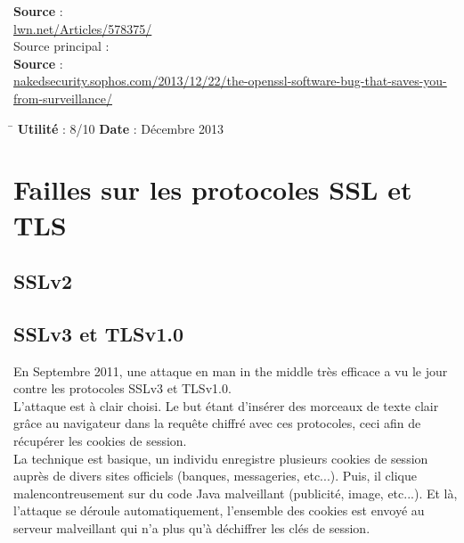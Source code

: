\documentclass{article}
\begin{document}
	\textbf{Source} : \\
	\href{https://lwn.net/Articles/578375/}{lwn.net/Articles/578375/}\\

	Source principal : \\
	\textbf{Source} : \\
	\href{http://nakedsecurity.sophos.com/2013/12/22/the-openssl-software-bug-that-saves-you-from-surveillance/}
	{nakedsecurity.sophos.com/2013/12/22/the-openssl-software-bug-that-saves-you-from-surveillance/}

	\begin{tabbing}
		\hspace{10cm}\=\kill
		\textbf{Utilité} : 8/10 \>	\textbf{Date} : Décembre 2013\\
	\end{tabbing}

	\newpage
	
	
	
	
\section{Failles sur les protocoles SSL et TLS}

\subsection{SSLv2}


\subsection{SSLv3 et TLSv1.0}

	En Septembre 2011, une attaque en man in the middle très efficace
	a vu le jour contre les protocoles SSLv3 et TLSv1.0.\\
	
	L'attaque est à clair choisi. Le but étant d'insérer des morceaux de
	texte clair grâce au navigateur dans la requête chiffré avec ces
	protocoles, ceci afin de récupérer les cookies de session.\\
	
	La technique est basique, un individu enregistre plusieurs cookies de
	session auprès de divers sites officiels (banques, messageries,
	etc...). Puis, il clique malencontreusement sur du code Java 
	malveillant (publicité, image, etc...). Et là, l'attaque se déroule
	automatiquement, l'ensemble des cookies est envoyé au serveur 
	malveillant qui n'a plus qu'à déchiffrer les clés de session.\\
	
\end{document}
